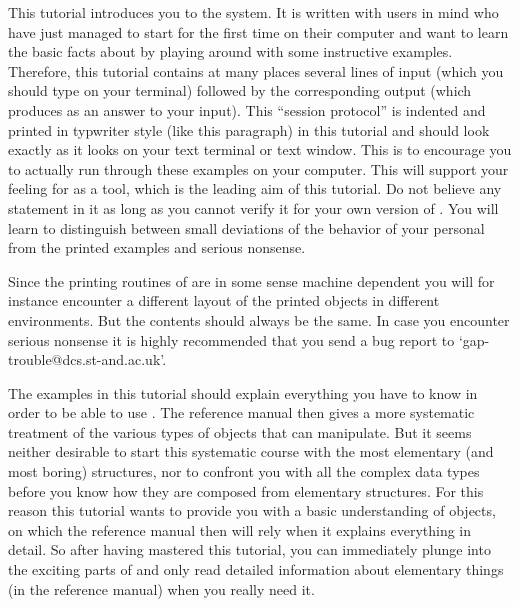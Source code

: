 


This tutorial introduces you to  the {\GAP}  system.  It is written  with
users in mind who have just managed to start {\GAP} for the first time on
their computer and want to learn the basic facts  about {\GAP} by playing
around with some instructive  examples. Therefore, this tutorial contains
at many  places several lines of  input  (which you  should type  on your
terminal) followed by the corresponding output  (which {\GAP} produces as
an answer to your input).
\begintt
    This ``session protocol'' is indented and printed in typwriter style
    (like this paragraph) in this tutorial and should look exactly as it
    looks on your text terminal or text window.
\endtt
This is  to encourage you to actually  run through these examples on your
computer. This will support your  feeling for {\GAP}  as a tool, which is
the leading aim of this  tutorial. Do not believe any  statement in it as
long  as you cannot verify  it for your own  version of  {\GAP}. You will
learn to distinguish  between small  deviations of  the behavior of  your
personal {\GAP} from the printed examples and serious nonsense.

Since the printing routines of {\GAP} are in some sense machine dependent
you will for instance encounter a different layout of the printed objects
in different environments.  But the  contents should always be the  same.
In case you encounter serious nonsense  it is highly recommended that you
send a bug report to `gap-trouble@dcs.st-and.ac.uk'.

The examples in this tutorial should  explain everything you have to know
in order to be able to use {\GAP}. The reference manual then gives a more
systematic  treatment of  the various types  of objects  that  {\GAP} can
manipulate.  But it  seems neither  desirable   to start this  systematic
course with  the  most elementary (and most   boring) structures, nor  to
confront you with all the complex data types before you know how they are
composed from elementary structures. For this reason
this tutorial wants to  provide you with a  basic understanding of {\GAP}
objects, on  which the reference manual  then will rely when  it explains
everything in detail.  So  after having mastered  this tutorial, you  can
immediately  plunge   into the exciting  parts  of  {\GAP} and  only read
detailed information about elementary   things (in the reference  manual)
when you really need it.

